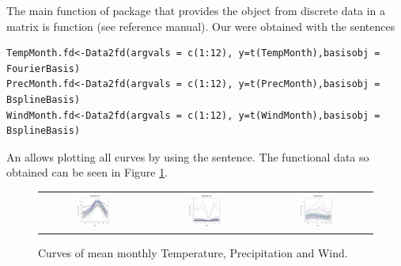 The main function of  package that provides the  object from discrete data in a matrix is  function (see  reference manual). Our  were obtained with the sentences

\begin{verbatim}
TempMonth.fd<-Data2fd(argvals = c(1:12), y=t(TempMonth),basisobj = FourierBasis)
PrecMonth.fd<-Data2fd(argvals = c(1:12), y=t(PrecMonth),basisobj = BsplineBasis)
WindMonth.fd<-Data2fd(argvals = c(1:12), y=t(WindMonth),basisobj = BsplineBasis)
\end{verbatim}

An  allows plotting all curves by using the   sentence. The functional data so obtained can be seen in Figure \ref{FDCurves}.

\begin{figure}
\begin{center}
\begin{tabular}{ccc}
\includegraphics[width=0.33\textwidth]{Graphs/FDTemp.png} &  \includegraphics[width=0.33\textwidth]{Graphs/FDPrec.png} & \includegraphics[width=0.33\textwidth]{Graphs/FDWind.png} \\
\end{tabular}
\end{center}
\caption{Curves of mean monthly Temperature, Precipitation and Wind.}
\label{FDCurves}
\end{figure}

